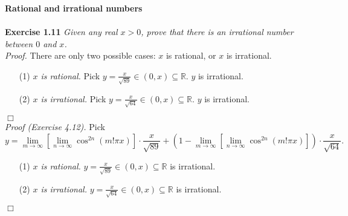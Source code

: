 \documentclass{article}
\begin{document}
\textbf{\large Rational and irrational numbers} \\\\



\textbf{Exercise 1.11}
\emph{Given any real $x > 0$,
prove that there is an irrational number between $0$ and $x$.} \\

\emph{Proof.}
There are only two possible cases: $x$ is rational, or $x$ is irrational.
\begin{enumerate}
\item[(1)]
\emph{$x$ is rational.}
Pick $y = \frac{x}{\sqrt{89}} \in (0, x) \subseteq \mathbb{R}$. $y$ is irrational.
\item[(2)]
\emph{$x$ is irrational.}
Pick $y = \frac{x}{\sqrt{64}} \in (0, x) \subseteq \mathbb{R}$. $y$ is irrational.
\end{enumerate}
$\Box$ \\

\emph{Proof (Exercise 4.12).}
Pick
$$y
= \lim_{m \rightarrow \infty}[\lim_{n \rightarrow \infty} \cos^{2n}(m!\pi x)]
\cdot \frac{x}{\sqrt{89}}
+
(1 - \lim_{m \rightarrow \infty}[\lim_{n \rightarrow \infty} \cos^{2n}(m!\pi x)])
\cdot \frac{x}{\sqrt{64}}.$$
\begin{enumerate}
\item[(1)]
\emph{$x$ is rational.}
$y = \frac{x}{\sqrt{89}} \in (0, x) \subseteq \mathbb{R}$ is irrational.
\item[(2)]
\emph{$x$ is irrational.}
$y = \frac{x}{\sqrt{64}} \in (0, x) \subseteq \mathbb{R}$ is irrational.
\end{enumerate}
$\Box$ \\\\
\end{document}
